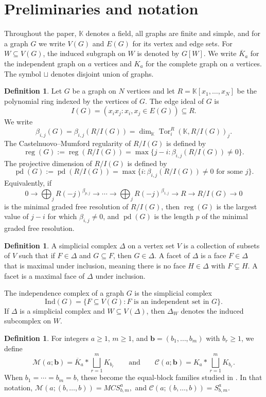 \documentclass[12pt]{article}
\theoremstyle{definition}
\newtheorem{definition}[theorem]{Definition}
\theoremstyle{remark}
\DeclareMathOperator{\reg}{reg}
\DeclareMathOperator{\pd}{pd}
\DeclareMathOperator{\Tor}{Tor}
\newcommand{\kk}{\mathbb{K}}
\newcommand{\MM}{\mathcal{M}}
\newcommand{\CC}{\mathcal{C}}
\newcommand{\ind}{\mathrm{Ind}}
\newcommand{\bk}[1]{\mathbf{#1}}
\begin{document}
	\section{Preliminaries and notation}\label{sec:prelim}
	
	Throughout the paper, $\kk$ denotes a field, all graphs are finite and simple, and for a graph $G$ we write $V(G)$ and $E(G)$ for its vertex and edge sets. For $W\subseteq V(G)$, the induced subgraph on $W$ is denoted by $G[W]$. We write $\overline{K}_a$ for the independent graph on $a$ vertices and $K_a$ for the complete graph on $a$ vertices. The symbol $\sqcup$ denotes disjoint union of graphs.
	

	\begin{definition}
		Let $G$ be a graph on $N$ vertices and let $R=\kk[x_1,\dots,x_N]$ be the polynomial ring indexed by the vertices of $G$. The edge ideal of $G$ is
		$$
		I(G)=(x_ix_j:{x_i,x_j}\in E(G))\subseteq R.
		$$
		We write
		$$
		\beta_{i,j}(G)=\beta_{i,j}(R/I(G))=\dim_{\kk}\Tor_i^R(\kk,R/I(G))_j.
		$$
		The Castelnuovo--Mumford regularity of $R/I(G)$ is defined by
		$$
		\reg(G):=\reg(R/I(G))=\max\{j-i:\beta_{i,j}(R/I(G))\neq 0\}.
		$$
		The projective dimension of $R/I(G)$ is defined by
		$$
		\pd(G):=\pd(R/I(G))=\max\{i:\beta_{i,j}(R/I(G))\neq 0\text{ for some }j\}.
		$$
		Equivalently, if
		$$
		0\to \bigoplus_j R(-j)^{\beta_{p,j}}\to \cdots \to \bigoplus_j R(-j)^{\beta_{1,j}}\to R\to R/I(G)\to 0
		$$
		is the minimal graded free resolution of $R/I(G)$, then $\reg(G)$ is the largest value of $j-i$ for which $\beta_{i,j}\neq 0$, and $\pd(G)$ is the length $p$ of the minimal graded free resolution.
	\end{definition}
	
	
	\begin{definition}
		A simplicial complex $\Delta$ on a vertex set $V$ is a collection of subsets of $V$ such that if $F \in \Delta$ and $G \subseteq F$, then $G \in \Delta$. A facet of $\Delta$ is a face $F \in \Delta$ that is maximal under inclusion, meaning there is no face $H \in \Delta$ with $F \subsetneq H$.	A facet is a maximal face of $\Delta$ under inclusion.
		
		The independence complex of a graph $G$ is the simplicial complex
		$$
		\ind(G)=\{F\subseteq V(G):F\text{ is an independent set in }G\}.
		$$
		If $\Delta$ is a simplicial complex and $W\subseteq V(\Delta)$, then $\Delta_W$ denotes the induced subcomplex on $W$.
	\end{definition}
	
	\begin{definition}
		For integers $a\geq 1$, $m\geq 1$, and $\bk{b}=(b_1,\dots,b_m)$ with $b_r\geq 1$, we define
		$$
		\MM(a;\bk{b})=\overline{K}_a * \bigsqcup_{r=1}^m K_{b_r}
		\qquad\text{and}\qquad
		\CC(a;\bk{b})=K_a * \bigsqcup_{r=1}^m K_{b_r}.
		$$
		When $b_1=\cdots=b_m=b$, these become the equal-block families studied in \cite{Rather2024}. In that notation,
		$ \MM(a;(b,\dots,b))=MCS^a_{b,m},$ and $
		\CC(a;(b,\dots,b))=S^a_{b,m}. $
	\end{definition}
	
\end{document}
